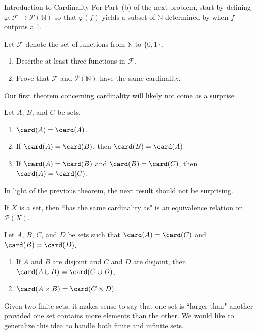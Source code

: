 \begin{section}{Introduction to Cardinality}
For Part~(b) of the next problem, start by defining $\varphi:\mathcal{F}\to \mathcal{P}(\mathbb{N})$ so that $\varphi(f)$ yields a subset of $\mathbb{N}$ determined by when $f$ outputs a 1.

\begin{problem}
Let $\mathcal{F}$ denote the set of functions from $\mathbb{N}$ to $\{0,1\}$. 
\begin{enumerate}[label=\textrm{(\alph*)}]
\item Describe at least three functions in $\mathcal{F}$.
\item Prove that $\mathcal{F}$ and $\mathcal{P}(\mathbb{N})$ have the same cardinality.
\end{enumerate}
\end{problem}

Our first theorem concerning cardinality will likely not come as a surprise.

\begin{theorem}
Let $A$, $B$, and $C$ be sets.
\begin{enumerate}[label=\textrm{(\alph*)}]
\item $\card(A)=\card(A)$.
\item If $\card(A)=\card(B)$, then $\card(B)=\card(A)$.
\item If $\card(A)=\card(B)$ and $\card(B)=\card(C)$, then $\card(A)=\card(C)$.
\end{enumerate}
\end{theorem}

In light of the previous theorem, the next result should not be surprising.

\begin{corollary}
If $X$ is a set, then ``has the same cardinality as" is an equivalence relation on $\mathcal{P}(X)$.
\end{corollary}

\begin{theorem}
Let $A$, $B$, $C$, and $D$ be sets such that $\card(A)=\card(C)$ and $\card(B)=\card(D)$.
\begin{enumerate}[label=\textrm{(\alph*)}]
\item If $A$ and $B$ are disjoint and $C$ and $D$ are disjoint, then $\card(A\cup B)=\card(C\cup D)$.
\item $\card(A\times B)=\card(C\times D)$.
\end{enumerate}
\end{theorem}

Given two finite sets, it makes sense to say that one set is ``larger than" another provided one set contains more elements than the other. We would like to generalize this idea to handle both finite and infinite sets. 


\end{section}
